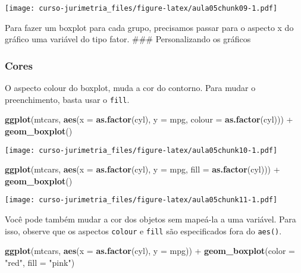 \documentclass[]{book}
\newenvironment{Shaded}{\begin{snugshade}}{\end{snugshade}}
\newcommand{\KeywordTok}[1]{\textcolor[rgb]{0.13,0.29,0.53}{\textbf{{#1}}}}
\newcommand{\DataTypeTok}[1]{\textcolor[rgb]{0.13,0.29,0.53}{{#1}}}
\newcommand{\StringTok}[1]{\textcolor[rgb]{0.31,0.60,0.02}{{#1}}}
\newcommand{\NormalTok}[1]{{#1}}
\begin{document}
\texttt{[image: curso-jurimetria\_files/figure-latex/aula05chunk09-1.pdf]}

Para fazer um boxplot para cada grupo, precisamos passar para o aspecto
x do gráfico uma variável do tipo fator. \#\#\# Personalizando os
gráficos

\subsubsection{Cores}\label{cores}

O aspecto colour do boxplot, muda a cor do contorno. Para mudar o
preenchimento, basta usar o \texttt{fill}.

\begin{Shaded}
\begin{Highlighting}[]
\KeywordTok{ggplot}\NormalTok{(mtcars, }\KeywordTok{aes}\NormalTok{(}\DataTypeTok{x =} \KeywordTok{as.factor}\NormalTok{(cyl), }\DataTypeTok{y =} \NormalTok{mpg, }\DataTypeTok{colour =} \KeywordTok{as.factor}\NormalTok{(cyl))) +}\StringTok{ }
\StringTok{  }\KeywordTok{geom_boxplot}\NormalTok{()}
\end{Highlighting}
\end{Shaded}

\texttt{[image: curso-jurimetria\_files/figure-latex/aula05chunk10-1.pdf]}

\begin{Shaded}
\begin{Highlighting}[]
\KeywordTok{ggplot}\NormalTok{(mtcars, }\KeywordTok{aes}\NormalTok{(}\DataTypeTok{x =} \KeywordTok{as.factor}\NormalTok{(cyl), }\DataTypeTok{y =} \NormalTok{mpg, }\DataTypeTok{fill =} \KeywordTok{as.factor}\NormalTok{(cyl))) +}\StringTok{ }\KeywordTok{geom_boxplot}\NormalTok{()}
\end{Highlighting}
\end{Shaded}

\texttt{[image: curso-jurimetria\_files/figure-latex/aula05chunk11-1.pdf]}

Você pode também mudar a cor dos objetos sem mapeá-la a uma variável.
Para isso, observe que os aspectos \texttt{colour} e \texttt{fill} são
especificados fora do \texttt{aes()}.

\begin{Shaded}
\begin{Highlighting}[]
\KeywordTok{ggplot}\NormalTok{(mtcars, }\KeywordTok{aes}\NormalTok{(}\DataTypeTok{x =} \KeywordTok{as.factor}\NormalTok{(cyl), }\DataTypeTok{y =} \NormalTok{mpg)) +}\StringTok{ }
\StringTok{  }\KeywordTok{geom_boxplot}\NormalTok{(}\DataTypeTok{color =} \StringTok{"red"}\NormalTok{, }\DataTypeTok{fill =} \StringTok{"pink"}\NormalTok{)}
\end{Highlighting}
\end{Shaded}
\end{document}
